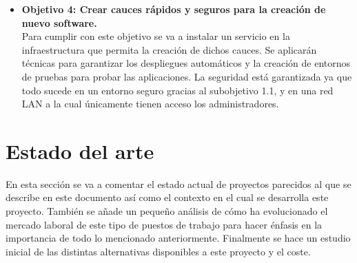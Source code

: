 \begin{text}
\begin{itemize}
		\item \textbf{Objetivo 4: Crear cauces rápidos y seguros para la creación de nuevo software.} \\
		Para cumplir con este objetivo se va a instalar un servicio en la infraestructura que permita la creación de dichos cauces. Se aplicarán técnicas para garantizar los despliegues automáticos y la creación de entornos de pruebas para probar las aplicaciones. La seguridad está garantizada ya que todo sucede en un entorno seguro gracias al subobjetivo 1.1, y en una red LAN a la cual únicamente tienen acceso los administradores.
	\end{itemize}
\end{text}
	
\section{Estado del arte}
	\begin{text}
		En esta sección se va a comentar el estado actual de proyectos parecidos al que se describe en este documento así como el contexto en el cual se desarrolla este proyecto. También se añade un pequeño análisis de cómo ha evolucionado el mercado laboral de este tipo de puestos de trabajo para hacer énfasis en la importancia de todo lo mencionado anteriormente. Finalmente se hace un estudio inicial de las distintas alternativas disponibles a este proyecto y el coste.
	\end{text}


